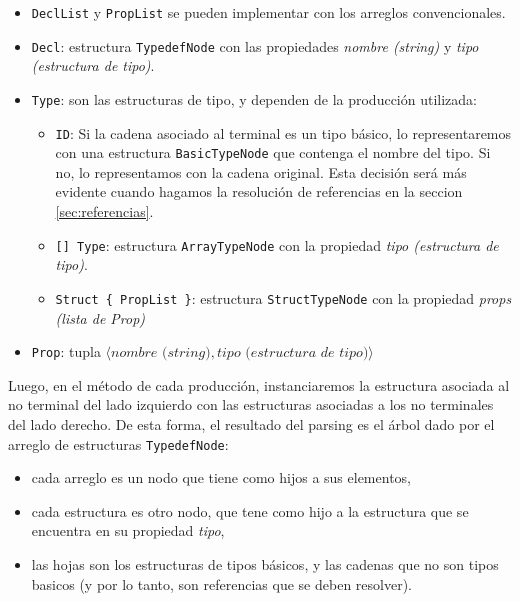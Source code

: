 \begin{itemize}
    \item \texttt{DeclList} y \texttt{PropList} se pueden implementar con los
        arreglos convencionales.
    \item \texttt{Decl}: estructura \texttt{TypedefNode} con las propiedades
        \textit{nombre (string)} y \textit{tipo (estructura de tipo)}.
    \item \texttt{Type}: son las estructuras de tipo, y dependen de la
        producción utilizada:
    \begin{itemize}
        \item \texttt{ID}: Si la cadena asociado al terminal es un tipo básico,
            lo representaremos con una estructura \texttt{BasicTypeNode} que
            contenga el nombre del tipo. Si no, lo representamos con la cadena
            original. Esta decisión será más evidente cuando hagamos la
            resolución de referencias en la seccion \ref{sec:referencias}.
        \item \texttt{[] Type}: estructura \texttt{ArrayTypeNode} con la
            propiedad \textit{tipo (estructura de tipo)}.
        \item \texttt{Struct \{ PropList \}}: estructura
            \texttt{StructTypeNode} con la propiedad \textit{props (lista de
            Prop)}
    \end{itemize}
    \item \texttt{Prop}: tupla $\langle \textit{nombre (string)}, \textit{tipo
        (estructura de tipo)}\rangle$
\end{itemize}

Luego, en el método de cada producción, instanciaremos la estructura asociada
al no terminal del lado izquierdo con las estructuras asociadas a los no
terminales del lado derecho. De esta forma, el resultado del parsing es el
árbol dado por el arreglo de estructuras \texttt{TypedefNode}: 

\begin{itemize}
    \item cada arreglo es un nodo que tiene como hijos a sus elementos,
    \item cada estructura es otro nodo, que tene como hijo a la estructura que
        se encuentra en su propiedad \textit{tipo},
    \item las hojas son los estructuras de tipos básicos, y las cadenas que no
        son tipos basicos (y por lo tanto, son referencias que se deben
        resolver).
\end{itemize}

